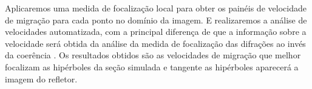 Aplicaremos uma medida de focalização local para obter os painéis de velocidade de migração para cada ponto no domínio da
imagem. E realizaremos a análise de velocidades automatizada, com a principal diferença de que a informação sobre a velocidade
será obtida da análise da medida de focalização das difrações ao invés da coerência \cite{sep_dif}.
Os resultados obtidos são as velocidades de migração que melhor focalizam as hipérboles da seção simulada e tangente as hipérboles
aparecerá a imagem do refletor.